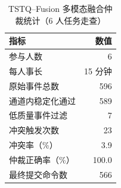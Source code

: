 \begin{table}[H]
  \centering
  \caption{TSTQ--Fusion 多模态融合仲裁统计（6 人任务走查）}
  \label{tab:fusion_stats}
  \small
  \begin{tabular}{lr}
  \hline
  指标 & 数值 \\
  \hline
  参与人数 & 6 \\
  每人事长 & 15 分钟 \\
  原始事件总数 & 596 \\
  通道内稳定化通过 & 589 \\
  低质量事件过滤 & 7 \\
  冲突触发次数 & 23 \\
  冲突率（\%） & 3.9 \\
  仲裁正确率（\%） & 100.0 \\
  最终提交命令数 & 566 \\
  \hline
  \end{tabular}
\end{table}
